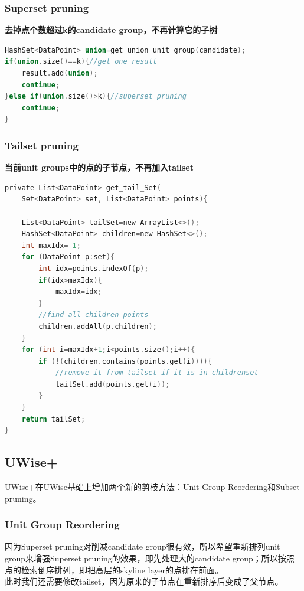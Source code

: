 \documentclass{article}
\begin{document}
\begin{CJK}{UTF8}{gbsn}
\subsubsection{Superset pruning}
\textbf{去掉点个数超过k的candidate group，不再计算它的子树}
\begin{lstlisting}[language=C]
HashSet<DataPoint> union=get_union_unit_group(candidate);
if(union.size()==k){//get one result
    result.add(union);
    continue;
}else if(union.size()>k){//superset pruning
    continue;
}
\end{lstlisting}

\subsubsection{Tailset pruning}
\textbf{当前unit groups中的点的子节点，不再加入tailset}
\begin{lstlisting}[language=C]
private List<DataPoint> get_tail_Set(
    Set<DataPoint> set, List<DataPoint> points){

    List<DataPoint> tailSet=new ArrayList<>();
    HashSet<DataPoint> children=new HashSet<>();
    int maxIdx=-1;
    for (DataPoint p:set){
        int idx=points.indexOf(p);
        if(idx>maxIdx){
            maxIdx=idx;
        }
        //find all children points
        children.addAll(p.children);
    }
    for (int i=maxIdx+1;i<points.size();i++){
        if (!(children.contains(points.get(i)))){
            //remove it from tailset if it is in childrenset
            tailSet.add(points.get(i));
        }
    }
    return tailSet;
}
\end{lstlisting}

\subsection{UWise+}
UWise+在UWise基础上增加两个新的剪枝方法：Unit Group Reordering和Subset pruning。

\subsubsection{Unit Group Reordering}
因为Superset pruning对削减candidate group很有效，所以希望重新排列unit group来增强Superset pruning的效果，即先处理大的candidate group；所以按照点的检索倒序排列，即把高层的skyline layer的点排在前面。\\
此时我们还需要修改tailset，因为原来的子节点在重新排序后变成了父节点。\\


\end{CJK}
\end{document}
